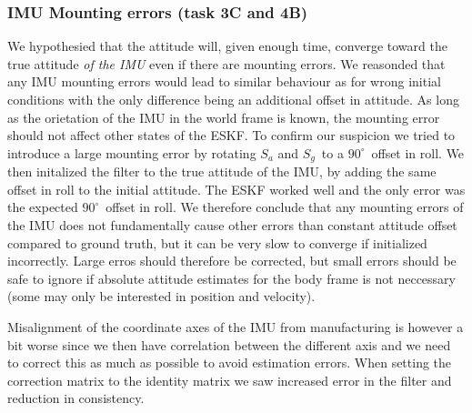 \subsubsection{IMU Mounting errors (task 3C and 4B)}
We hypothesied that the attitude will, given enough time, converge toward the true attitude \textit{of the IMU} even if there are mounting errors. We reasonded that any IMU mounting errors would lead to similar behaviour as for wrong initial conditions with the only difference being an additional offset in attitude. As long as the orietation of the IMU in the world frame is known, the mounting error should not affect other states of the ESKF. 
To confirm our suspicion we tried to introduce a large mounting error by rotating $S_a$ and $S_g$ to a $90^\circ$ offset in roll. We then initalized the filter to the true attitude of the IMU, by adding the same offset in roll to the initial attitude.
The ESKF worked well and the only error was the expected $90^\circ$ offset in roll. We therefore conclude that any mounting errors of the IMU does not fundamentally cause other errors than constant attitude offset compared to ground truth, but it can be very slow to converge if initialized incorrectly. Large erros should therefore be corrected, but small errors should be safe to ignore if absolute attitude estimates for the body frame is not neccessary (some may only be interested in position and velocity).   

Misalignment of the coordinate axes of the IMU from manufacturing is however a bit worse since we then have correlation between the different axis and we need to correct this as much as possible to avoid estimation errors. When setting the correction matrix to the identity matrix we saw increased error in the filter and reduction in consistency.  




